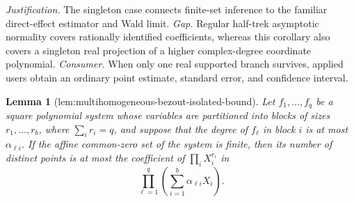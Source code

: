 \documentclass{article}
\newtheorem{lemma}{Lemma}
\begin{document}
\par\smallskip\noindent \textit{Justification.} The singleton case connects finite-set inference to the familiar direct-effect estimator and Wald limit. \textit{Gap.} Regular half-trek asymptotic normality covers rationally identified coefficients, whereas this corollary also covers a singleton real projection of a higher complex-degree coordinate polynomial. \textit{Consumer.} When only one real supported branch survives, applied users obtain an ordinary point estimate, standard error, and confidence interval.

\begin{lemma}[lem:multihomogeneous-bezout-isolated-bound]\label{lem:multihomogeneous-bezout-isolated-bound}
Let \(f_1,\ldots,f_q\) be a square polynomial system whose variables are partitioned into blocks of sizes \(r_1,\ldots,r_b\), where \(\sum_i r_i=q\), and suppose that the degree of \(f_\ell\) in block \(i\) is at most \(\alpha_{\ell i}\). If the affine common-zero set of the system is finite, then its number of distinct points is at most the coefficient of \(\prod_i X_i^{r_i}\) in
\[
 \prod_{\ell=1}^{q}\left(\sum_{i=1}^{b}\alpha_{\ell i}X_i\right).
\]
\end{lemma}
\end{document}
